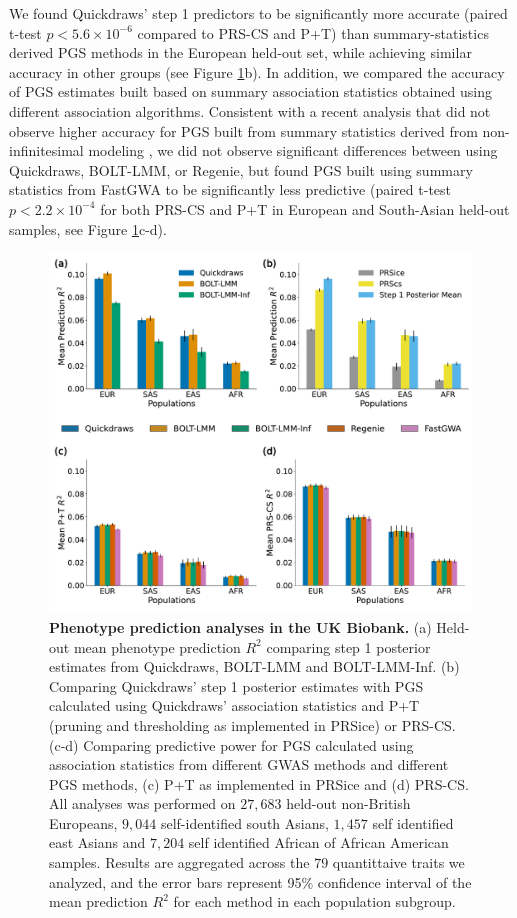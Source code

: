 %
We found Quickdraws' step 1 predictors to be significantly more accurate (paired t-test  $p < 5.6 \times 10^{-6}$ compared to PRS-CS and P+T) than summary-statistics derived PGS methods in the European held-out set, while achieving similar accuracy in other groups (see Figure \ref{fig:ukb_pgs}b).
%
In addition, we compared the accuracy of PGS estimates built based on summary association statistics obtained using different association algorithms.
%
Consistent with a recent analysis that did not observe higher accuracy for PGS built from summary statistics derived from non-infinitesimal modeling \cite{weissbrod2022leveraging}, we did not observe significant differences between using Quickdraws, BOLT-LMM, or Regenie, but found PGS built using summary statistics from FastGWA to be significantly less predictive (paired t-test $p < 2.2 \times 10^{-4}$ for both PRS-CS and P+T in European and South-Asian held-out samples, see Figure \ref{fig:ukb_pgs}c-d).
%

\begin{figure}[h!]
    \centering
    \includegraphics[width=\textwidth]{figures/qd_panel_pgs.pdf}
    \caption{\textbf{Phenotype prediction analyses in the UK Biobank.} (a) Held-out mean phenotype prediction $R^2$ comparing step 1 posterior estimates from Quickdraws, BOLT-LMM and BOLT-LMM-Inf. (b) Comparing Quickdraws' step 1 posterior estimates with PGS calculated using Quickdraws' association statistics and P+T (pruning and thresholding as implemented in PRSice) or PRS-CS. (c-d) Comparing predictive power for PGS calculated using association statistics from different GWAS methods and different PGS methods, (c) P+T as implemented in PRSice and (d) PRS-CS. All analyses was performed on $27{,}683$ held-out non-British Europeans, $9{,}044$ self-identified south Asians, $1{,}457$ self identified east Asians and $7{,}204$ self identified African of African American samples. Results are aggregated across the $79$ quantittaive traits we analyzed, and the error bars represent 95\% confidence interval of the mean prediction $R^2$ for each method in each population subgroup.}
    \label{fig:ukb_pgs}
\end{figure}

